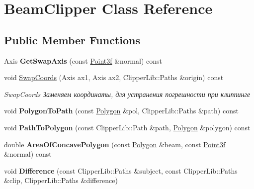 \hypertarget{class_beam_clipper}{}\section{Beam\+Clipper Class Reference}
\label{class_beam_clipper}
\subsection*{Public Member Functions}
\begin{DoxyCompactItemize}
\item 
\mbox{\label{class_beam_clipper_aa1b23b57cf992f6fad5e05b1e5e9c16a}} 
Axis {\bfseries Get\+Swap\+Axis} (const \mbox{\hyperlink{struct_point3f}{Point3f}} \&normal) const
\item 
void \mbox{\hyperlink{class_beam_clipper_a8afe4452a3ed644e467df223da280c2c}{Swap\+Coords}} (Axis ax1, Axis ax2, Clipper\+Lib\+::\+Paths \&origin) const
\begin{DoxyCompactList}\small\item\em Swap\+Coords Заменяем координаты, для устранения погрешности при клиппинге \end{DoxyCompactList}\item 
\mbox{\label{class_beam_clipper_ac67b36e2de28a35be87e233bba9b461f}} 
void {\bfseries Polygon\+To\+Path} (const \mbox{\hyperlink{class_polygon}{Polygon}} \&pol, Clipper\+Lib\+::\+Paths \&path) const
\item 
\mbox{\label{class_beam_clipper_a306bc753adf8daf53dcc4e126f8a88b4}} 
void {\bfseries Path\+To\+Polygon} (const Clipper\+Lib\+::\+Path \&path, \mbox{\hyperlink{class_polygon}{Polygon}} \&polygon) const
\item 
\mbox{\label{class_beam_clipper_a62a4466ae3951c636dab63f795779f8c}} 
double {\bfseries Area\+Of\+Concave\+Polygon} (const \mbox{\hyperlink{class_polygon}{Polygon}} \&beam, const \mbox{\hyperlink{struct_point3f}{Point3f}} \&normal) const
\item 
\mbox{\label{class_beam_clipper_afec0872b412ee6653d8a0e0f10c457ce}} 
void {\bfseries Difference} (const Clipper\+Lib\+::\+Paths \&subject, const Clipper\+Lib\+::\+Paths \&clip, Clipper\+Lib\+::\+Paths \&difference)

\end{DoxyCompactItemize}
